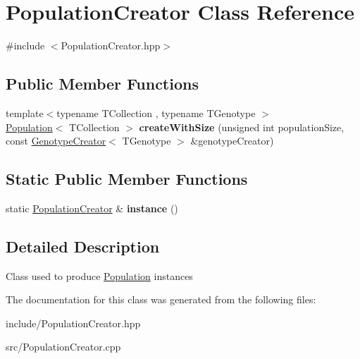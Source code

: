 \hypertarget{classPopulationCreator}{\section{Population\+Creator Class Reference}
\label{classPopulationCreator}
}


{\ttfamily \#include $<$Population\+Creator.\+hpp$>$}

\subsection*{Public Member Functions}
\begin{DoxyCompactItemize}
\item 
\hypertarget{classPopulationCreator_a24d6e7cbc4eb4723f96fb8d9b6cf97c0}{{\footnotesize template$<$typename T\+Collection , typename T\+Genotype $>$ }\\\hyperlink{classPopulation}{Population}$<$ T\+Collection $>$ {\bfseries create\+With\+Size} (unsigned int population\+Size, const \hyperlink{classGenotypeCreator}{Genotype\+Creator}$<$ T\+Genotype $>$ \&genotype\+Creator)}\label{classPopulationCreator_a24d6e7cbc4eb4723f96fb8d9b6cf97c0}

\end{DoxyCompactItemize}
\subsection*{Static Public Member Functions}
\begin{DoxyCompactItemize}
\item 
\hypertarget{classPopulationCreator_a9397cdce2b231478034b155bcd5fa4cf}{static \hyperlink{classPopulationCreator}{Population\+Creator} \& {\bfseries instance} ()}\label{classPopulationCreator_a9397cdce2b231478034b155bcd5fa4cf}

\end{DoxyCompactItemize}


\subsection{Detailed Description}
Class used to produce \hyperlink{classPopulation}{Population} instances 

The documentation for this class was generated from the following files\+:\begin{DoxyCompactItemize}
\item 
include/Population\+Creator.\+hpp\item 
src/Population\+Creator.\+cpp\end{DoxyCompactItemize}
